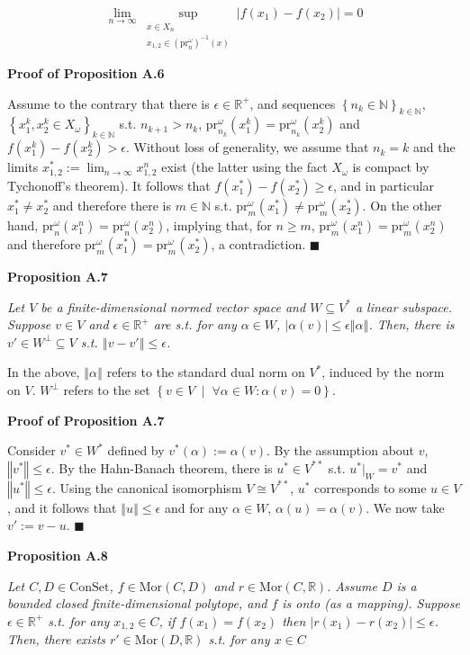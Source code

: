 \documentclass[a4paper]{article}
\newcommand{\Co}[1]{}
\newcommand{\AP}[1]{\left(#1\right)}
\newcommand{\AC}[1]{\left\{#1\right\}}
\newcommand{\ACM}[2]{\left\{#1\;\middle\vert\;#2\right\}}
\newcommand{\Abs}[1]{\left\vert #1 \right\vert}
\newcommand{\Norm}[1]{\left\Vert #1 \right\Vert}
\newcommand{\Nats}{\mathbb{N}}
\newcommand{\Reals}{\mathbb{R}}
\newcommand{\Mor}{\mathrm{Mor}}
\newcommand{\Lim}[1]{\lim_{#1 \rightarrow \infty}}
\newcommand{\Con}{{\boldsymbol{\mathrm{ConSet}}}}
\newcommand{\Prj}{\mathrm{pr}}
\newcommand{\Prjo}{\mathrm{pr}^\omega_n}
\begin{document}
$$\Lim{n}\sup_{\substack{x\in X_n\\x_{1,2}\in\AP{\Prjo}^{-1}(x)}}\Abs{f\AP{x_1}-f\AP{x_2}}=0$$

\textbf{Proof of Proposition A.6}\Co{b}

Assume to the contrary that there is $\epsilon\in\Reals^+$, and sequences $\AC{n_k\in\Nats}_{k\in\Nats}$, $\AC{x_1^k,x_2^k\in X_\omega}_{k\in\Nats}$ s.t. $n_{k+1}>n_k$, $\Prj^\omega_{n_k}\AP{x_1^k}=\Prj^\omega_{n_k}\AP{x_2^k}$ and $f\AP{x_1^k}-f\AP{x_2^k}>\epsilon$. Without loss of generality, we assume that $n_k=k$ and the limits $x_{1,2}^*:=\Lim{n}x_{1,2}^n$ exist (the latter using the fact $X_\omega$ is compact by Tychonoff's theorem). It follows that $f\AP{x_1^*}-f\AP{x_2^*}\geq\epsilon$, and in particular $x_1^*\ne x_2^*$ and therefore there is $m\in\Nats$ s.t. $\Prj^\omega_m\AP{x_1^*}\ne\Prj^\omega_m\AP{x_2^*}$. On the other hand, $\Prjo\AP{x_1^n}=\Prjo\AP{x_2^n}$, implying that, for $n\geq m$, $\Prj^\omega_{m}\AP{x_1^n}=\Prj^\omega_{m}\AP{x_2^n}$ and therefore $\Prj^\omega_m\AP{x_1^*}=\Prj^\omega_m\AP{x_2^*}$, a contradiction. $\blacksquare$

\textbf{Proposition A.7}\Co{b}

\textit{Let $V$ be a finite-dimensional normed vector space and $W\subseteq V^*$ a linear subspace. Suppose $v\in V$ and $\epsilon\in\Reals^+$ are s.t. for any $\alpha\in W$, $\Abs{\alpha(v)} \leq \epsilon\Norm{\alpha}$. Then, there is $v'\in W^\bot\subseteq V$ s.t. $\Norm{v-v'}\leq\epsilon$.}\Co{i}

In the above, $\Norm{\alpha}$ refers to the standard dual norm on $V^*$, induced by the norm on $V$. $W^\bot$ refers to the set $\ACM{v\in V}{\forall\alpha\in W: \alpha(v)=0}$.

\textbf{Proof of Proposition A.7}\Co{b}

Consider $v^*\in W^*$ defined by $v^*(\alpha):=\alpha(v)$. By the assumption about $v$, $\Norm{v^*}\leq\epsilon$. By the Hahn-Banach theorem, there is $u^*\in V^{**}$ s.t. $u^*|_W=v^*$ and $\Norm{u^*}\leq\epsilon$. Using the canonical isomorphism $V\cong V^{**}$, $u^*$ corresponds to some $u\in V$, and it follows that $\Norm{u}\leq\epsilon$ and for any $\alpha\in W$, $\alpha(u)=\alpha(v)$. We now take $v':=v-u$. $\blacksquare$

\textbf{Proposition A.8}\Co{b}

\textit{Let $C,D\in\Con$, $f\in\Mor(C,D)$ and $r\in\Mor\AP{C,\Reals}$. Assume $D$ is a bounded closed finite-dimensional polytope, and $f$ is onto (as a mapping). Suppose $\epsilon\in\Reals^+$ s.t. for any $x_{1,2}\in C$, if $f\AP{x_1}=f\AP{x_2}$ then $\Abs{r\AP{x_1}-r\AP{x_2}} \leq \epsilon$. Then, there exists $r'\in\Mor\AP{D,\Reals}$ s.t. for any $x\in C$}\Co{i} 
\end{document}
